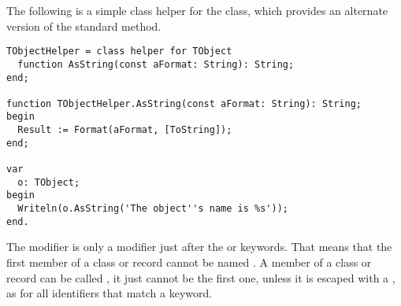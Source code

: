 The following is a simple class helper for the  class, which provides
an alternate version of the standard  method.
\begin{verbatim}
TObjectHelper = class helper for TObject
  function AsString(const aFormat: String): String; 
end;
 
function TObjectHelper.AsString(const aFormat: String): String;
begin
  Result := Format(aFormat, [ToString]);
end;
 
var
  o: TObject;
begin
  Writeln(o.AsString('The object''s name is %s'));
end.
\end{verbatim}

\begin{remark}
The  modifier is only a modifier just after the  or
 keywords. That means that the first member of a class or record
cannot be named . A member of a class or record can be called
, it just cannot be the first one, unless it is escaped with a
\var{\&}, as for all identifiers that match a keyword.
\end{remark}

